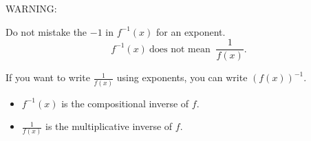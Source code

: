\begin{frame}
\alert<1->{WARNING:}

Do not mistake the $-1$ in $f^{-1}(x)$ for an exponent.
\[
f^{-1}(x) \ \text{does not mean } \ \frac{1}{f(x)} .
\]

If you want to write $\frac{1}{f(x)}$ using exponents, you can write $(f(x))^{-1}$.
\begin{itemize}
\item<2->  $f^{-1}(x)$ is the compositional inverse of $f$.
\item<3->  $\frac{1}{f(x)}$ is the multiplicative inverse of $f$.
\end{itemize}
\end{frame}
